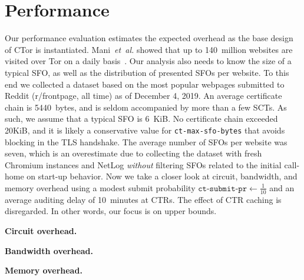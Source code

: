 \section{Performance} \label{sec:performance}
Our performance evaluation estimates the expected overhead as the base design of
CTor is instantiated.  Mani~\emph{et~al.} showed that up to 140~million websites
are visited over Tor on a daily basis~\cite{mani}.  Our analysis also needs to
know the size of a typical SFO, as well as the distribution of presented SFOs
per website.  To this end we collected a dataset based on the most popular
webpages submitted to Reddit (r/frontpage, all time) as of December 4, 2019.  An
average certificate chain is 5440~bytes, and is seldom accompanied by more than
a few SCTs.  As such, we assume that a typical SFO is 6~KiB.  No certificate
chain exceeded 20KiB, and it is likely a conservative value for
\texttt{ct-max-sfo-bytes} that avoids blocking in the TLS handshake.  The
average number of SFOs per website was seven, which is an overestimate due to
collecting the dataset with fresh Chromium instances and NetLog \emph{without}
filtering SFOs related to the initial call-home on start-up behavior.  Now we
take a closer look at circuit, bandwidth, and memory overhead using a modest
submit probability $\texttt{ct-submit-pr} \gets \frac{1}{10}$ and an
average auditing delay of 10~minutes at CTRs.  The effect of CTR caching is
disregarded.  In other words, our focus is on upper bounds.

\textbf{Circuit overhead.}

\textbf{Bandwidth overhead.}

\textbf{Memory overhead.}

